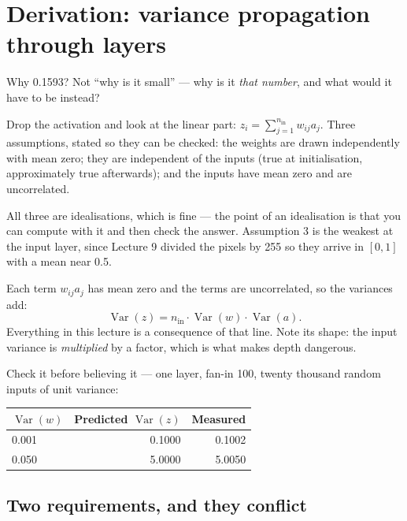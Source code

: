 \documentclass[11pt,a4paper]{article}
\begin{document}
\section{Derivation: variance propagation through layers}

Why 0.1593? Not ``why is it small'' --- why is it \emph{that number}, and what
would it have to be instead?

Drop the activation and look at the linear part:
$z_i = \sum_{j=1}^{n_{\text{in}}} w_{ij}a_j$. Three assumptions, stated so they
can be checked: the weights are drawn independently with mean zero; they are
independent of the inputs (true at initialisation, approximately true
afterwards); and the inputs have mean zero and are uncorrelated.

All three are idealisations, which is fine --- the point of an idealisation is
that you can compute with it and then check the answer. Assumption 3 is the
weakest at the input layer, since Lecture 9 divided the pixels by 255 so they
arrive in $[0,1]$ with a mean near 0.5.

\begin{derivbox}[title={The one recursion}]
Each term $w_{ij}a_j$ has mean zero and the terms are uncorrelated, so the
variances add:
\[ \operatorname{Var}(z)
   = n_{\text{in}}\cdot\operatorname{Var}(w)\cdot\operatorname{Var}(a). \]
Everything in this lecture is a consequence of that line. Note its shape: the
input variance is \emph{multiplied} by a factor, which is what makes depth
dangerous.
\end{derivbox}

Check it before believing it --- one layer, fan-in 100, twenty thousand random
inputs of unit variance:

\begin{center}
\small
\begin{tabular}{lrr}
\toprule
$\operatorname{Var}(w)$ & \textbf{Predicted $\operatorname{Var}(z)$} &
\textbf{Measured} \\
\midrule
0.001 & 0.1000 & 0.1002 \\
0.050 & 5.0000 & 5.0050 \\
\bottomrule
\end{tabular}
\end{center}

\subsection{Two requirements, and they conflict}
\end{document}
